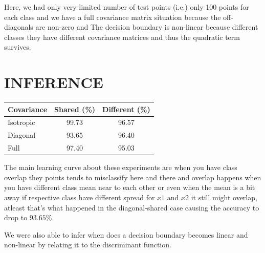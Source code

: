 \documentclass[11pt,a4paper]{article}
\begin{document}
Here, we had only very limited number of test points (i.e.) only 100 points for each class and we have a full covariance matrix situation because the off-diagonals are non-zero and The decision boundary is non-linear because different classes they have different covariance matrices and thus the quadratic term survives.


\clearpage
\section*{INFERENCE}
\begin{center}
\begin{tabular}{lcc}
\toprule
Covariance & Shared (\%) & Different (\%) \\
\midrule
Isotropic & 99.73 & 96.57 \\
Diagonal & 93.65 & 96.40 \\
Full & 97.40 & 95.03 \\
\bottomrule
\end{tabular}
\end{center}

The main learning curve about these experiments are when you have class overlap they points tends to misclassify here and there and overlap happens when you have different class mean near to each other or even when the mean is a bit away if respective class have different spread for $x1$ and $x2$ it still might overlap, atleast that's what happened in the diagonal-shared case causing the accuracy to drop to $93.65 \%$.

We were also able to infer when does a decision boundary becomes linear and non-linear by relating it to the discriminant function.
\end{document}
